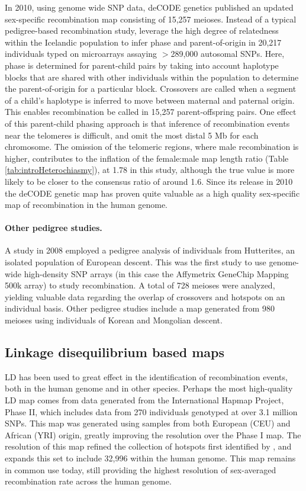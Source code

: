 In 2010, using genome wide SNP data, deCODE genetics published an updated sex-specific recombination map consisting of 15,257 meioses\cite{Kong2010}.
Instead of a typical pedigree-based recombination study, \citet{Kong2010} leverage the high degree of relatedness within the Icelandic population to infer phase and parent-of-origin in 20,217 individuals typed on microarrays assaying $>$289,000 autosomal SNPs.
Here, phase is determined for parent-child pairs by taking into account haplotype blocks that are shared with other individuals within the population to determine the parent-of-origin for a particular block.
Crossovers are called when a segment of a child's haplotype is inferred to move between maternal and paternal origin.
This enables recombination be called in 15,257 parent-offspring pairs.
One effect of this parent-child phasing approach is that inference of recombination events near the telomeres is difficult, and \citet{Kong2010} omit the most distal 5 Mb for each chromosome.
The omission of the telomeric regions, where male recombination is higher, contributes to the inflation of the female:male map length ratio (Table \ref{tab:introHeterochiasmy}), at 1.78 in this study, although the true value is more likely to be closer to the consensus ratio of around 1.6.
Since its release in 2010 the deCODE genetic map has proven quite valuable as a high quality sex-specific map of recombination in the human genome.


\paragraph{Other pedigree studies.}
A study in 2008 employed a pedigree analysis of individuals from Hutterites, an isolated population of European descent\cite{Coop2008}.
This was the first study to use genome-wide high-density SNP arrays (in this case the Affymetrix GeneChip Mapping 500k array) to study recombination.
A total of 728 meioses were analyzed, yielding valuable data regarding the overlap of crossovers and hotspots on an individual basis.
Other pedigree studies include a map generated from 980 meioses using individuals of Korean and Mongolian descent\cite{Bleazard2013}.

\subsection{Linkage disequilibrium based maps}

LD has been used to great effect in the identification of recombination events, both in the human genome and in other species.
Perhaps the most high-quality LD map comes from data generated from the International Hapmap Project, Phase II\cite{hapmap2007}, which includes data from 270 individuals genotyped at over 3.1 million SNPs.
This map was generated using samples from both European (CEU) and African (YRI) origin, greatly improving the resolution over the Phase I map.
The resolution of this map refined the collection of hotspots first identified by \citet{Myers2005}, and expands this set to include 32,996 within the human genome.
This map remains in common use today, still providing the highest resolution of sex-averaged recombination rate across the human genome.



